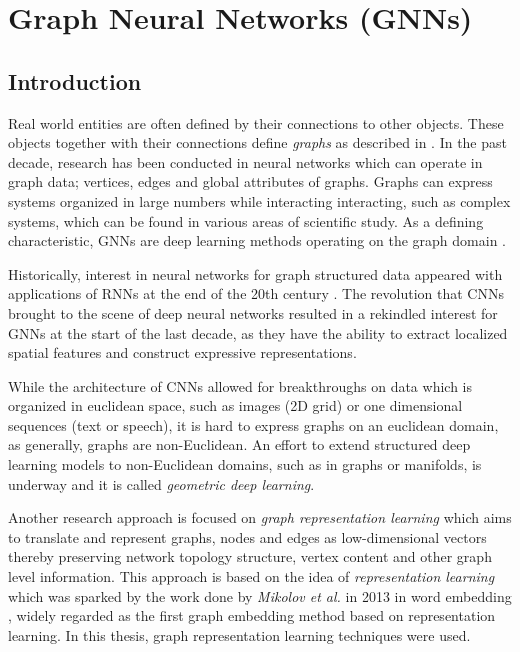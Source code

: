 \chapter{Graph Neural Networks (GNNs)} \label{GNN}

\section{Introduction}

Real world entities are often defined by their connections to other
objects. These objects together with their connections define
\textit{graphs} as described in . In the past decade,
research has been conducted in neural networks \cite{article:TGNNM}
which can operate in graph data; vertices, edges and global attributes
of graphs. Graphs can express systems organized in large numbers while interacting
interacting, such as complex systems, which can be found in various areas
of scientific study. As a defining characteristic, GNNs are deep
learning methods operating on the graph domain \cite{article:zhou}.

Historically, interest in neural networks for graph structured data
appeared with applications of RNNs at the end of the 20th century
\cite{article:sperduti}. The revolution that CNNs brought to the
scene of deep neural networks resulted in a rekindled interest for
GNNs at the start of the last decade, as they have the ability to
extract localized spatial features and construct expressive representations.

While the architecture of CNNs allowed for breakthroughs on data which
is organized in euclidean space, such as images (2D grid) or
one dimensional sequences (text or speech), it is hard to express
graphs on an euclidean domain, as generally, graphs are non-Euclidean.
An effort to extend structured deep learning models to non-Euclidean
domains, such as in graphs or manifolds, is underway and it is called
\textit{geometric deep learning}\cite{article:geomDeep}. 

Another research approach is focused on \textit{graph representation
  learning} \cite{hamilton2017representation, article:zhang} which aims
to translate and represent graphs, nodes and edges as low-dimensional
vectors thereby preserving network topology structure, vertex content
and other graph level information. This approach is based on the idea
of \textit{representation learning} which was sparked by the work done
by \textit{Mikolov et al.} in 2013 in word embedding
\cite{mikolov2013efficient,mikolov2013distributed}, widely regarded
as the first graph embedding method based on representation learning.
In this thesis, graph representation learning techniques
were used.

